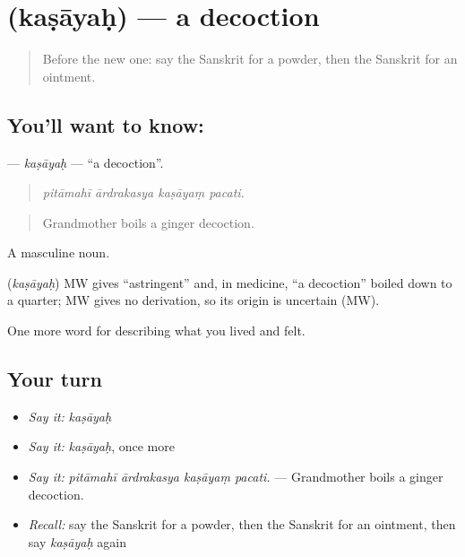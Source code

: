 \section[\texorpdfstring{\sk{कषायः} (kaṣāyaḥ)}{कषायः (kaṣāyaḥ)}]{ (kaṣāyaḥ) — a decoction}

\label{lesson:SA-C483-kasayah}



\begin{quote}
Before the new one: say the Sanskrit for a powder, then the Sanskrit for an ointment.
\end{quote}

\subsection*{You'll want to know: }
\textbf{} — \emph{kaṣāyaḥ} — \textquotedblleft{}a decoction\textquotedblright{}.

\begin{quote}
   
\end{quote}

\begin{quote}
\emph{pitāmahī ārdrakasya kaṣāyaṃ pacati.}
\end{quote}

\begin{quote}
Grandmother boils a ginger decoction.
\end{quote}

A masculine noun.

\begin{cousinweb}
\textbf{} (\emph{kaṣāyaḥ}) MW gives \textquotedblleft{}astringent\textquotedblright{} and, in medicine, \textquotedblleft{}a decoction\textquotedblright{} boiled down to a quarter; MW gives no derivation, so its origin is uncertain (MW).
\end{cousinweb}

\begin{grammarlens}[title={What you've built}]
One more word for describing what you lived and felt.
\end{grammarlens}

\subsection*{Your turn}
\begin{itemize}
\raggedright
  \item \emph{Say it:} \emph{kaṣāyaḥ}
  \item \emph{Say it:} \emph{kaṣāyaḥ}, once more
  \item \emph{Say it:} \emph{pitāmahī ārdrakasya kaṣāyaṃ pacati.} — Grandmother boils a ginger decoction.
  \item \emph{Recall:} say the Sanskrit for a powder, then the Sanskrit for an ointment, then say \emph{kaṣāyaḥ} again
\end{itemize}

